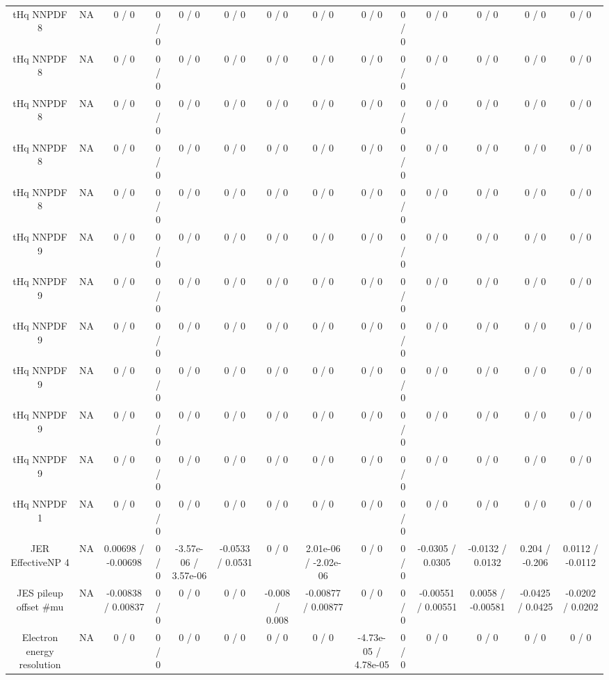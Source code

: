\documentclass[10pt]{article}
\begin{document}
\begin{table}[htbp]
\begin{center}
\begin{tabular}{|c|c|c|c|c|c|c|c|c|c|c|c|c|c|}
  tHq NNPDF 8 &    NA    & 0 / 0 & 0 / 0 & 0 / 0 & 0 / 0 & 0 / 0 & 0 / 0 & 0 / 0 & 0 / 0 & 0 / 0 & 0 / 0 & 0 / 0 & 0 / 0 \\ 
  tHq NNPDF 8 &    NA    & 0 / 0 & 0 / 0 & 0 / 0 & 0 / 0 & 0 / 0 & 0 / 0 & 0 / 0 & 0 / 0 & 0 / 0 & 0 / 0 & 0 / 0 & 0 / 0 \\ 
  tHq NNPDF 8 &    NA    & 0 / 0 & 0 / 0 & 0 / 0 & 0 / 0 & 0 / 0 & 0 / 0 & 0 / 0 & 0 / 0 & 0 / 0 & 0 / 0 & 0 / 0 & 0 / 0 \\ 
  tHq NNPDF 8 &    NA    & 0 / 0 & 0 / 0 & 0 / 0 & 0 / 0 & 0 / 0 & 0 / 0 & 0 / 0 & 0 / 0 & 0 / 0 & 0 / 0 & 0 / 0 & 0 / 0 \\ 
  tHq NNPDF 8 &    NA    & 0 / 0 & 0 / 0 & 0 / 0 & 0 / 0 & 0 / 0 & 0 / 0 & 0 / 0 & 0 / 0 & 0 / 0 & 0 / 0 & 0 / 0 & 0 / 0 \\ 
  tHq NNPDF 9 &    NA    & 0 / 0 & 0 / 0 & 0 / 0 & 0 / 0 & 0 / 0 & 0 / 0 & 0 / 0 & 0 / 0 & 0 / 0 & 0 / 0 & 0 / 0 & 0 / 0 \\ 
  tHq NNPDF 9 &    NA    & 0 / 0 & 0 / 0 & 0 / 0 & 0 / 0 & 0 / 0 & 0 / 0 & 0 / 0 & 0 / 0 & 0 / 0 & 0 / 0 & 0 / 0 & 0 / 0 \\ 
  tHq NNPDF 9 &    NA    & 0 / 0 & 0 / 0 & 0 / 0 & 0 / 0 & 0 / 0 & 0 / 0 & 0 / 0 & 0 / 0 & 0 / 0 & 0 / 0 & 0 / 0 & 0 / 0 \\ 
  tHq NNPDF 9 &    NA    & 0 / 0 & 0 / 0 & 0 / 0 & 0 / 0 & 0 / 0 & 0 / 0 & 0 / 0 & 0 / 0 & 0 / 0 & 0 / 0 & 0 / 0 & 0 / 0 \\ 
  tHq NNPDF 9 &    NA    & 0 / 0 & 0 / 0 & 0 / 0 & 0 / 0 & 0 / 0 & 0 / 0 & 0 / 0 & 0 / 0 & 0 / 0 & 0 / 0 & 0 / 0 & 0 / 0 \\ 
  tHq NNPDF 9 &    NA    & 0 / 0 & 0 / 0 & 0 / 0 & 0 / 0 & 0 / 0 & 0 / 0 & 0 / 0 & 0 / 0 & 0 / 0 & 0 / 0 & 0 / 0 & 0 / 0 \\ 
  tHq NNPDF 1 &    NA    & 0 / 0 & 0 / 0 & 0 / 0 & 0 / 0 & 0 / 0 & 0 / 0 & 0 / 0 & 0 / 0 & 0 / 0 & 0 / 0 & 0 / 0 & 0 / 0 \\ 
  JER EffectiveNP 4 &    NA    & 0.00698 / -0.00698 & 0 / 0 & -3.57e-06 / 3.57e-06 & -0.0533 / 0.0531 & 0 / 0 & 2.01e-06 / -2.02e-06 & 0 / 0 & 0 / 0 & -0.0305 / 0.0305 & -0.0132 / 0.0132 & 0.204 / -0.206 & 0.0112 / -0.0112 \\ 
  JES pileup offset #mu &    NA    & -0.00838 / 0.00837 & 0 / 0 & 0 / 0 & 0 / 0 & -0.008 / 0.008 & -0.00877 / 0.00877 & 0 / 0 & 0 / 0 & -0.00551 / 0.00551 & 0.0058 / -0.00581 & -0.0425 / 0.0425 & -0.0202 / 0.0202 \\ 
  Electron energy resolution &    NA    & 0 / 0 & 0 / 0 & 0 / 0 & 0 / 0 & 0 / 0 & 0 / 0 & -4.73e-05 / 4.78e-05 & 0 / 0 & 0 / 0 & 0 / 0 & 0 / 0 & 0 / 0 \\ 

\end{tabular}
\end{center}
\end{table}
\end{document}
